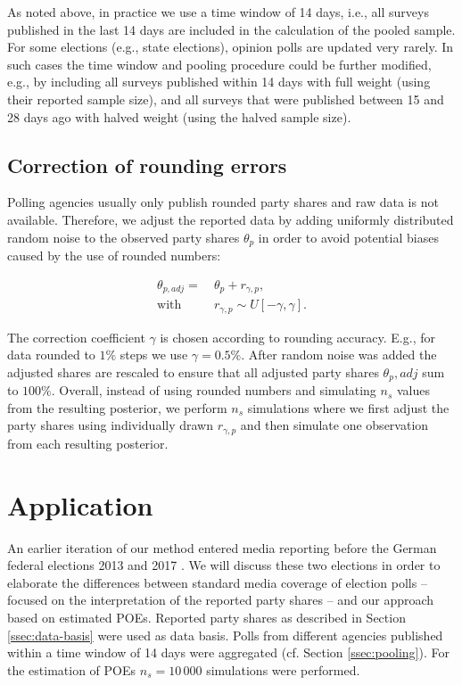 \documentclass[smallcondensed]{svjour3}     %
\begin{document}
As noted above, in practice we use a time window of 14 days, i.e., all surveys
published in the last 14 days are included in the calculation of the pooled
sample. For some elections (e.g., state elections), opinion polls are
updated very rarely. In such cases the time window and pooling procedure
could be further modified, e.g., by including all surveys published within 14 days with full
weight (using their reported sample size), and all surveys that were published
between 15 and 28 days ago with halved weight (using the halved sample size).


\subsection{Correction of rounding errors}\label{ssec:rounding}
Polling agencies usually only publish rounded party shares and
raw data is not available. Therefore, we adjust the reported data by adding
uniformly distributed random noise to the observed party shares $\theta_p$ in order
to avoid potential biases caused by the use of rounded numbers:

\begin{equation}
\begin{aligned}
\theta_{p,adj} = \ &\theta_p + r_{\gamma,p}, \\
\text{with} \ \ \ \ \ &r_{\gamma,p} \sim U[-\gamma,\gamma].
\end{aligned}
\end{equation}

The correction coefficient $\gamma$ is chosen according to rounding accuracy.
E.g., for data rounded to $1\%$ steps we use $\gamma = 0.5\%$. After random noise
was added the adjusted shares are rescaled to ensure that all adjusted party shares
$\theta_p,adj$ sum to $100\%$. Overall, instead of using rounded numbers and simulating
$n_s$ values from the resulting posterior, we perform $n_s$ simulations where we
first adjust the party shares using individually drawn $r_{\gamma,p}$ and
then simulate one observation from each resulting posterior.\\


\section{Application} \label{sec:application}
An earlier iteration of our method entered media reporting before the German
federal elections 2013 and 2017 \citep[cf.][]{wahlistik_2013, gelitz_2017}.
We will discuss these two elections in order to elaborate the differences between
standard media coverage of election polls -- focused on the interpretation of the
reported party shares -- and our approach based on estimated POEs. Reported party
shares as described in Section \ref{ssec:data-basis} were used as data basis.
Polls from different agencies published within a time window of 14 days were
aggregated (cf. Section \ref{ssec:pooling}). For the estimation of POEs
$n_{s} = 10\,000$ simulations were performed.
\end{document}
